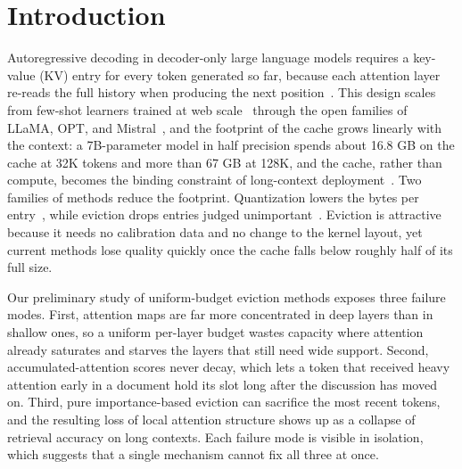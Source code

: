 \section{Introduction}\label{sec:intro}

Autoregressive decoding in decoder-only large language models requires a
key-value (KV) entry for every token generated so far, because each
attention layer re-reads the full history when producing the next
position~\cite{shazeer2019fast,vaswani2017attention}. This design
scales from few-shot learners trained at web scale~\cite{brown2020language}
through the open families of LLaMA, OPT, and
Mistral~\cite{touvron2023llama,touvron2023llama2,zhang2022opt,jiang2023mistral},
and the footprint of the cache grows linearly with the context: a
7B-parameter model in half precision spends about 16.8 GB on the cache
at 32K tokens and more than 67 GB at 128K, and the cache, rather than
compute, becomes the binding constraint of long-context
deployment~\cite{pope2023efficiently,kwon2023vllm}. Two families of
methods reduce the footprint. Quantization lowers the bytes per
entry~\cite{dettmers2022llmint8,liu2024kivi,hooper2024kvquant}, while
eviction drops entries judged unimportant~\cite{zhang2023h2o,
liu2023scissorhands,xiao2023efficient,PLACEHOLDER_oren2024tova_verify}. Eviction is
attractive because it needs no calibration data and no change to the
kernel layout, yet current methods lose quality quickly once the cache
falls below roughly half of its full size.

Our preliminary study of uniform-budget eviction methods exposes three
failure modes. First, attention maps are far more concentrated in deep
layers than in shallow ones, so a uniform per-layer budget wastes
capacity where attention already saturates and starves the layers that
still need wide support. Second, accumulated-attention scores never
decay, which lets a token that received heavy attention early in a
document hold its slot long after the discussion has moved on. Third,
pure importance-based eviction can sacrifice the most recent tokens,
and the resulting loss of local attention structure shows up as a
collapse of retrieval accuracy on long contexts. Each failure mode is
visible in isolation, which suggests that a single mechanism cannot fix
all three at once.

